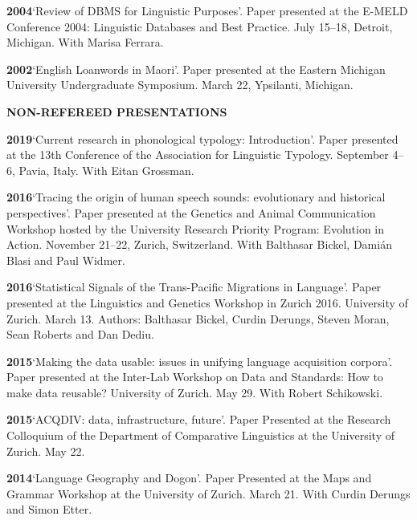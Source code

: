 \documentclass[11pt]{article}
\newcommand{\hangpara}{
 \setlength{\parindent}{0in} %
 \hangindent=0.42in %
}
\begin{document}
\vskip 6pt
\hangpara
{\bf 2004}\hspace{1ex}`Review of DBMS for Linguistic Purposes'. Paper presented at the E-MELD Conference 2004: Linguistic Databases and Best Practice. July 15--18, Detroit, Michigan. With Marisa Ferrara.

\vskip 6pt
\hangpara
{\bf 2002}\hspace{1ex}`English Loanwords in Maori'. Paper presented at the Eastern Michigan University Undergraduate Symposium. March 22, Ypsilanti, Michigan.


\vskip 20pt
\begin{flushleft}
{\bf NON-REFEREED PRESENTATIONS}
\end{flushleft}

\hangpara
{\bf 2019}\hspace{1ex}`Current research in phonological typology: Introduction'. Paper presented at the 13th Conference of the Association for Linguistic Typology. September 4--6, Pavia, Italy. With Eitan Grossman.

\hangpara
\vskip 6pt
{\bf 2016}\hspace{1ex}`Tracing the origin of human speech sounds: evolutionary and historical perspectives'. Paper presented at the Genetics and Animal Communication Workshop hosted by the University Research Priority Program: Evolution in Action. November 21--22, Zurich, Switzerland. With Balthasar Bickel, Dami{\'a}n Blasi and Paul Widmer.

\hangpara
\vskip 6pt
{\bf 2016}\hspace{1ex}`Statistical Signals of the Trans-Pacific Migrations in Language'. Paper presented at the Linguistics and Genetics Workshop in Zurich 2016. University of Zurich. March 13. Authors: Balthasar Bickel, Curdin Derungs, Steven Moran, Sean Roberts and Dan Dediu.

\hangpara
\vskip 6pt
{\bf 2015}\hspace{1ex}`Making the data usable: issues in unifying language acquisition corpora'. Paper presented at the Inter-Lab Workshop on Data and Standards: How to make data reusable? University of Zurich. May 29. With Robert Schikowski.

\vskip 6pt
\hangpara
{\bf 2015}\hspace{1ex}`ACQDIV: data, infrastructure, future'. Paper Presented at the Research Colloquium of the Department of Comparative Linguistics at the University of Zurich. May 22.

\vskip 6pt
\hangpara
{\bf 2014}\hspace{1ex}`Language Geography and Dogon'. Paper Presented at the Maps and Grammar Workshop at the University of Zurich. March 21. With Curdin Derungs and Simon Etter.
\end{document}

